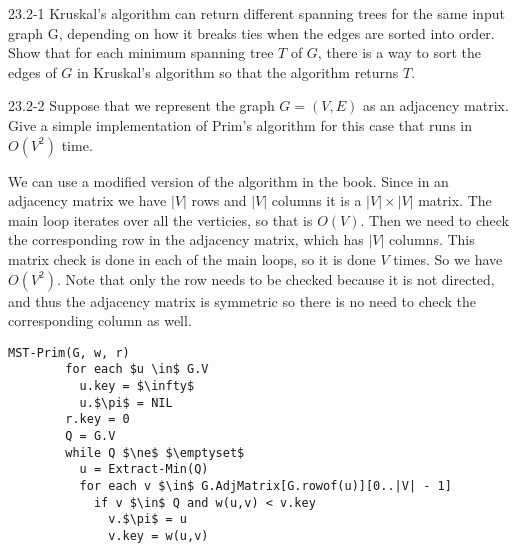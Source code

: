 \begin{problem}{23.2-1}
  Kruskal's algorithm can return different spanning trees for the same input graph G, depending on how it breaks ties
  when the edges are sorted into order. Show that for each minimum spanning tree $T$ of $G$, there is a way to sort the
  edges of $G$ in Kruskal's algorithm so that the algorithm returns $T$.
\end{problem}

\begin{problem}{23.2-2}
  Suppose that we represent the graph $G = (V,E)$ as an adjacency matrix. Give a simple implementation of Prim's
  algorithm for this case that runs in $O(V^2)$ time.
  \begin{solution}
    We can use a modified version of the algorithm in the book. Since in an adjacency matrix we have $|V|$ rows and $|V|$
    columns it is a $|V| \times |V|$ matrix. The main loop iterates over all the verticies, so that is $O(V)$. Then we need
    to check the corresponding row in the adjacency matrix, which has $|V|$ columns. This matrix check is done in each of
    the main loops, so it is done $V$ times. So we have $O(V^2)$. Note that only the row needs to be checked because it
    is not directed, and thus the adjacency matrix is symmetric so there is no need to check the corresponding column as
    well.
    \begin{lstlisting}[mathescape]
      MST-Prim(G, w, r)
        for each $u \in$ G.V
          u.key = $\infty$
          u.$\pi$ = NIL
        r.key = 0
        Q = G.V
        while Q $\ne$ $\emptyset$
          u = Extract-Min(Q)
          for each v $\in$ G.AdjMatrix[G.rowof(u)][0..|V| - 1]
            if v $\in$ Q and w(u,v) < v.key
              v.$\pi$ = u
              v.key = w(u,v)
    \end{lstlisting}
  \end{solution}
\end{problem}


